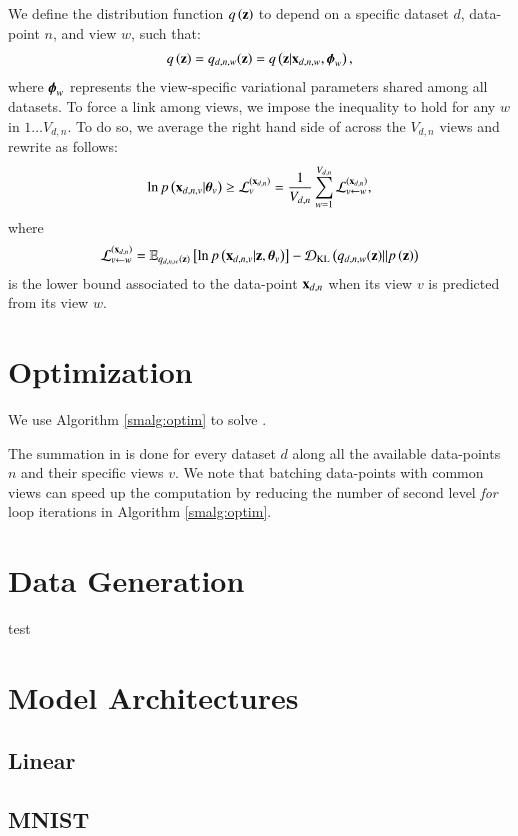 We define the distribution function $q\left(\mathbf{z}\right)$ to depend on a specific dataset $d$, data-point $n$, and view $w$, such that:
\begin{equation}\label{smeq:q}
\begin{aligned}
q\left(\mathbf{z}\right) = q_{d,n,w}(\mathbf{z}) = q\left(\mathbf{z}|\mathbf{x}_{d,n,w}, \boldsymbol{\phi}_w\right),
\end{aligned}
\end{equation}
where $\boldsymbol{\phi}_w$ represents the view-specific variational parameters shared among all datasets.
To force a link among views, we impose the inequality  to hold for any $w$ in $1 \ldots V_{d,n}$.
To do so, we average the right hand side of  across the $V_{d,n}$ views and rewrite  as follows:
\begin{equation}\label{smeq:newLB}
\begin{aligned}
\ln p\left(\mathbf{x}_{d,n,v}|\boldsymbol{\theta}_v\right) \geq \mathcal{L}_v^{(\mathbf{x}_{d,n})} = \frac{1}{V_{d,n}} \sum_{w=1}^{V_{d,n}} \mathcal{L}_{v \leftarrow w}^{(\mathbf{x}_{d,n})},
\end{aligned}
\end{equation}
where
\begin{equation}\label{smeq:LBdnvw}
\begin{aligned}
\mathcal{L}_{v \leftarrow w}^{(\mathbf{x}_{d,n})} = \operatorname{\mathbb{E}}_{q_{d,n,w}(\mathbf{z})}\left[\ln p\left(\mathbf{x}_{d,n,v}|\mathbf{z}, \boldsymbol{\theta}_v\right)\right] - \operatorname{\mathcal{D}_{KL}}\left(q_{d,n,w}(\mathbf{z})||p\left(\mathbf{z}\right)\right)
\end{aligned}
\end{equation}
is the lower bound associated to the data-point $\mathbf{x}_{d,n}$ when its view $v$ is predicted from its view $w$.

\section{Optimization}
\label{sm:optimization}

We use Algorithm \ref{smalg:optim} to solve .

The summation in  is done for every dataset $d$ along all the available data-points $n$ and their specific views $v$.
We note that batching data-points with common views can speed up the computation by reducing the number of second level \textit{for} loop iterations in Algorithm \ref{smalg:optim}.

\section{Data Generation}
test
\section{Model Architectures}
\subsection{Linear}
\subsection{MNIST}
\label{sm:ssec:mnist}
